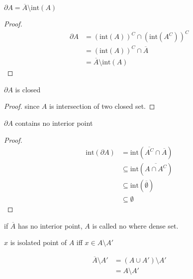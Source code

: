 \documentclass[11pt,a4paper]{article}
\begin{document}
\begin{lem}
    $\partial A = \overline{A} \setminus \text{int}(A)$
\end{lem}

\begin{proof}
   \begin{align*}
    \partial A &= \left(\text{int}(A) \right)^C \cap \left(\text{int}(A^C) \right)^C \\
    &= \left(\text{int}(A) \right)^C \cap \overline{A} \\
    &= \overline{A} \setminus \text{int}(A)
   \end{align*} 
\end{proof}

\begin{lem}
    $\partial A$ is closed
\end{lem}

\begin{proof}
    since $A$ is intersection of two closed set.
\end{proof}


\begin{lem}
    $\partial A$ contains no interior point
\end{lem}

\begin{proof}
    \begin{align*}
        \text{int}(\partial A) &= \text{int}(\overline{A^C} \cap \overline{A}) \\
        & \subseteq \text{int}(\overline{A \cap A^C}) \\
        & \subseteq \text{int}(\overline{\emptyset}) \\
        & \subseteq \emptyset
    \end{align*}
\end{proof}

if $\overline{A}$ has no interior point, $A$ is called no where dense set.

\begin{definition}
    $x$ is isolated point of $A$ iff $x \in A \setminus A'$ 
\end{definition}

\begin{lem}
    \begin{align*}
        \overline{A} \setminus A' &= \left( A \cup A'\right) \setminus A' \\
        &=  A \setminus A'
    \end{align*}
\end{lem}
\end{document}
